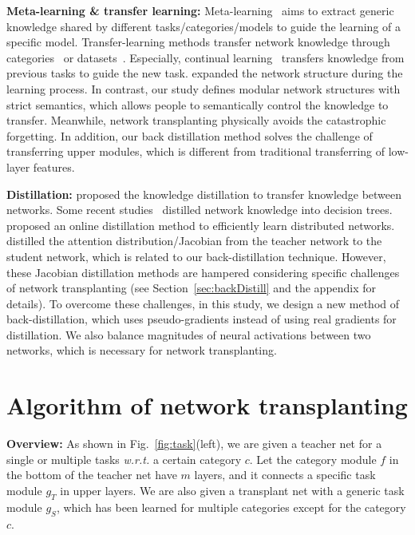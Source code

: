 \documentclass[10pt,twocolumn,letterpaper]{article}
\begin{document}
\textbf{Meta-learning \& transfer learning:} Meta-learning~\cite{meta1,meta2,meta3} aims to extract generic knowledge shared by different tasks/categories/models to guide the learning of a specific model. Transfer-learning methods transfer network knowledge through categories~\cite{CNNAnalysis_2} or datasets~\cite{UnsuperTransferCNN}. Especially, continual learning~\cite{ProgressiveNN,PathNet,continualLearning,LifelongLearning,metaContinual} transfers knowledge from previous tasks to guide the new task. \cite{ProgressiveNN,LifelongLearning} expanded the network structure during the learning process. In contrast, our study defines modular network structures with strict semantics, which allows people to semantically control the knowledge to transfer. Meanwhile, network transplanting physically avoids the catastrophic forgetting. In addition, our back distillation method solves the challenge of transferring upper modules, which is different from traditional transferring of low-layer features.

\textbf{Distillation:} \cite{distill} proposed the knowledge distillation to transfer knowledge between networks. Some recent studies~\cite{distillDecisionTree,RNNTree} distilled network knowledge into decision trees. \cite{distillDistributed} proposed an online distillation method to efficiently learn distributed networks. \cite{distillAttention,distillJacobian} distilled the attention distribution/Jacobian from the teacher network to the student network, which is related to our back-distillation technique. However, these Jacobian distillation methods are hampered considering specific challenges of network transplanting (see Section~\ref{sec:backDistill} and the appendix for details). To overcome these challenges, in this study, we design a new method of back-distillation, which uses pseudo-gradients instead of using real gradients for distillation. We also balance magnitudes of neural activations between two networks, which is necessary for network transplanting.

\section{Algorithm of network transplanting}

\textbf{Overview:} As shown in Fig.~\ref{fig:task}(left), we are given a teacher net for a single or multiple tasks \emph{w.r.t.} a certain category $c$. Let the category module $f$ in the bottom of the teacher net have $m$ layers, and it connects a specific task module {\small$g_{T}$} in upper layers. We are also given a transplant net with a generic task module {\small$g_{S}$}, which has been learned for multiple categories except for the category $c$.
\end{document}
